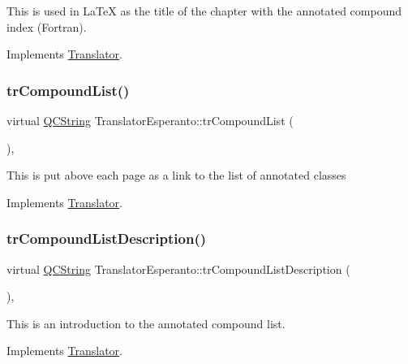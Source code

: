 This is used in La\+TeX as the title of the chapter with the annotated compound index (Fortran). 

Implements \mbox{\hyperlink{class_translator}{Translator}}.

\mbox{\label{class_translator_esperanto_ad20787929e1c083e6ba51464533cd354}} 
\subsubsection{\texorpdfstring{trCompoundList()}{trCompoundList()}}
{\footnotesize\ttfamily virtual \mbox{\hyperlink{class_q_c_string}{Q\+C\+String}} Translator\+Esperanto\+::tr\+Compound\+List (\begin{DoxyParamCaption}{ }\end{DoxyParamCaption})\hspace{0.3cm}{\ttfamily [inline]}, {\ttfamily [virtual]}}

This is put above each page as a link to the list of annotated classes 

Implements \mbox{\hyperlink{class_translator}{Translator}}.

\mbox{\label{class_translator_esperanto_ab570aa9fa545080dc4e05cf9602c3775}} 
\subsubsection{\texorpdfstring{trCompoundListDescription()}{trCompoundListDescription()}}
{\footnotesize\ttfamily virtual \mbox{\hyperlink{class_q_c_string}{Q\+C\+String}} Translator\+Esperanto\+::tr\+Compound\+List\+Description (\begin{DoxyParamCaption}{ }\end{DoxyParamCaption})\hspace{0.3cm}{\ttfamily [inline]}, {\ttfamily [virtual]}}

This is an introduction to the annotated compound list. 

Implements \mbox{\hyperlink{class_translator}{Translator}}.


